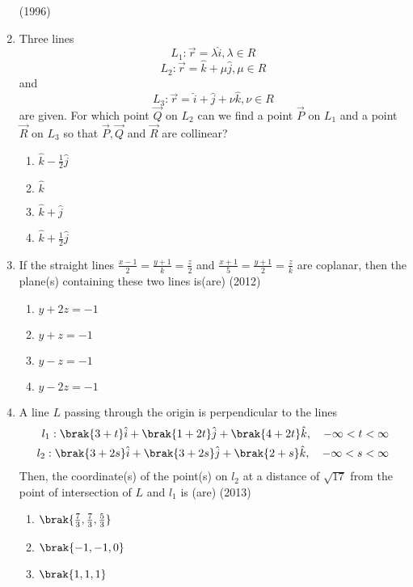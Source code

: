 \begin{enumerate}[label=\thesubsection.\arabic*.,ref=\thesubsection.\theenumi]
\hfill{(1996)}
\item %
	Three lines $$L_1:\vec{r}=\lambda\hat{i}, \lambda\in R$$ 
		$$L_2:\vec{r}=\hat{k}+\mu\hat{j}, \mu\in R$$ and
		$$L_3:\vec{r}=\hat{i}+\hat{j}+\nu\hat{k}, \nu\in R$$
		are given. For which point $\vec{Q}$ on $L_2$ can we find a point $\vec{P}$ on $L_1$ and a point $\vec{R}$ on $L_3$ so that $\vec{P},\vec{Q}$ and $\vec{R}$ are collinear? \hfill{}
\begin{multicols}{4}
  \begin{enumerate}
	  \item $\hat{k}-\frac{1}{2}\hat{j}$
	  \item $\hat{k}$
	  \item $\hat{k}+\hat{j}$
	  \item $\hat{k}+\frac{1}{2}\hat{j}$
   \end{enumerate}
\end{multicols}
	\item If the straight lines $\frac{x-1}{2}=\frac{y+1}{k}=\frac{z}{2}$ and $\frac{x+1}{5}=\frac{y+1}{2}=\frac{z}{k}$ are coplanar, then the plane(s) containing these two lines is(are) \hfill{(2012)}
\begin{multicols}{4}
		\begin{enumerate}
			\item $y+2z=-1$
			\item $y+z=-1$
			\item $y-z=-1$
			\item $y-2z=-1$
		\end{enumerate}
\end{multicols}
	\item A line $L$ passing through the origin is perpendicular to the lines
		\begin{align*}
			l_1 : \brak{3+t}\hat{i}+\brak{1+2t}\hat{j}+\brak{4+2t}\hat{k},\quad -\infty<t<\infty \\
			l_2 : \brak{3+2s}\hat{i}+\brak{3+2s}\hat{j}+\brak{2+s}\hat{k}, \quad -\infty<s<\infty 
		\end{align*}
		Then, the coordinate(s) of the point(s) on $l_2$ at a distance of $\sqrt{17}$ from the point of intersection of $L$ and $l_1$ is (are) \hfill{(2013)}
\begin{multicols}{4}
		\begin{enumerate}
			\item $\brak{\frac{7}{3},\frac{7}{3},\frac{5}{3}}$
			\item $\brak{-1,-1,0}$
			\item $\brak{1,1,1}$

\end{enumerate}
\end{multicols}
\end{enumerate}
